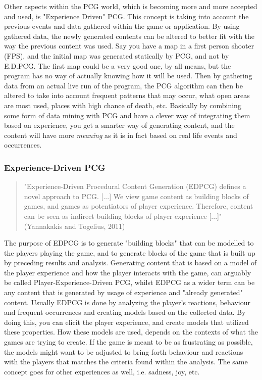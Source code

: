 Other aspects within the PCG world, which is becoming more and more accepted and used, is "Experience Driven" PCG\cite{art:exppcg}. This concept is taking into account the previous events and data gathered within the game or application. By using gathered data, the newly generated contents can be altered to better fit with the way the previous content was used. Say you have a map in a first person shooter (FPS), and the initial map was generated statically by PCG, and not by E.D.PCG. The first map could be a very good one, by all means, but the program has no way of actually knowing how it will be used. Then by gathering data from an actual live run of the program, the PCG algorithm can then be altered to take into account frequent patterns that may occur, what open areas are most used, places with high chance of death, etc. Basically by combining some form of data mining with PCG and have a clever way of integrating them based on experience, you get a smarter way of generating content, and the content will have more \textit{meaning} as it is in fact based on real life events and occurrences.

\subsubsection{Experience-Driven PCG}
\begin{quotation} 
"Experience-Driven Procedural Content Generation (EDPCG) defines a novel approach to PCG. [...] We view game content as building blocks of games, and games as potentiators of player experience. Therefore, content can be seen as indirect building blocks of player experience [...]" (Yannakakis and Togelius, 2011) \cite{art:edpcg}
\end{quotation}

The purpose of EDPCG is to generate "building blocks" that can be modelled to the players playing the game, and to generate blocks of the game that is built up by preceding results and analysis. Generating content that is based on a model of the player experience and how the player interacts with the game, can arguably be called Player-Experience-Driven PCG, whilst EDPCG as a wider term can be any content that is generated by usage of experience and "already generated" content. Usually EDPCG is done by analyzing the player's reactions, behaviour and frequent occurrences and creating models based on the collected data. By doing this, you can elicit the player experience, and create models that utilized these properties. How these models are used, depends on the contexts of what the games are trying to create. If the game is meant to be as frustrating as possible, the models might want to be adjusted to bring forth behaviour and reactions with the players that matches the criteria found within the analysis. The same concept goes for other experiences as well, i.e. sadness, joy, etc.\\\

